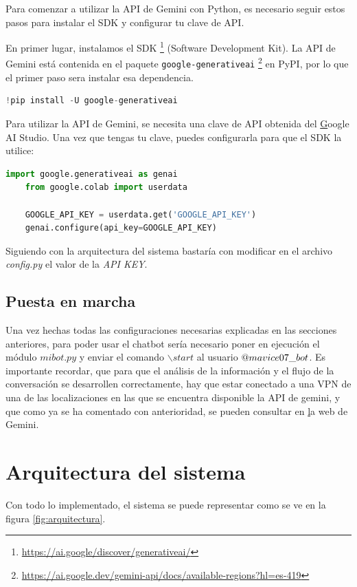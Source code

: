 Para comenzar a utilizar la API de Gemini con Python, es necesario seguir estos pasos para instalar el SDK y configurar tu clave de API.

En primer lugar, instalamos el SDK \footnote{\url{https://ai.google/discover/generativeai/}} (Software Development Kit). La API de Gemini está contenida en el paquete \texttt{google-generativeai} \footnote{\url{https://ai.google.dev/gemini-api/docs/available-regions?hl=es-419}} en PyPI, por lo que el primer paso sera instalar esa dependencia.

\begin{lstlisting}[language=Python]
	!pip install -U google-generativeai
\end{lstlisting}

Para utilizar la API de Gemini, se necesita una clave de API obtenida del \href{https://aistudio.google.com/app/apikey} Google AI Studio. Una vez que tengas tu clave, puedes configurarla para que el SDK la utilice:

\begin{lstlisting}[language=Python]
	import google.generativeai as genai
	from google.colab import userdata
	
	GOOGLE_API_KEY = userdata.get('GOOGLE_API_KEY')
	genai.configure(api_key=GOOGLE_API_KEY)
\end{lstlisting}


Siguiendo con la arquitectura del sistema bastaría con modificar en el archivo \textit{config.py} el valor de la \textit{API KEY}.

\subsection{Puesta en marcha} 
Una vez hechas todas las configuraciones necesarias explicadas en las secciones anteriores, para poder usar el chatbot sería necesario poner en ejecución el módulo $mibot.py$ y enviar el comando $\backslash start$ al usuario $\makeatletter @ mavice07\_bot$. Es importante recordar, que para que el análisis de la información y el flujo de la conversación se desarrollen correctamente, hay que estar conectado a una VPN de una de las localizaciones en las que se encuentra disponible la API de gemini, y que como ya se ha comentado con anterioridad, se pueden consultar en \href{https://ai.google.dev/gemini-api/docs/available-regions?hl=es-419} la web de Gemini.
\section{Arquitectura del sistema}
Con todo lo implementado, el sistema se puede representar como se ve en la figura \ref{fig:arquitectura}. 

